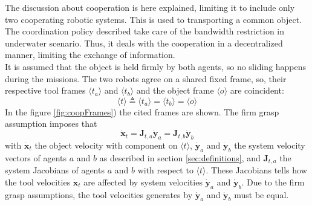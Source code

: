 The discussion about cooperation is here explained, limiting it to include only two cooperating robotic systems. This is used to transporting a common object. The coordination policy described take care of the bandwidth restriction in underwater scenario. Thus, it deals with the cooperation in a decentralized manner, limiting the exchange of information.\\
It is assumed that the object is held firmly by both agents, so no sliding happens during the missions. The two robots agree on a shared fixed frame, so, their respective tool frames $\langle t_a \rangle$ and $\langle t_b \rangle$ and the object frame $\langle o \rangle$ are coincident: 
\begin{equation*} 
\langle t \rangle \triangleq \langle t_a \rangle = \langle t_b \rangle = \langle o \rangle
\end{equation*}
In the figure \ref{fig:coopFrames}) the cited frames are shown.
The firm grasp assumption imposes that
\begin{equation}\label{eq:coopintro}
	\boldsymbol{\dot{x}}_t = \boldsymbol{J}_{t,a} \boldsymbol{\dot{y}}_a = \boldsymbol{J}_{t,b} \boldsymbol{\dot{y}}_b
\end{equation}
with $\boldsymbol{\dot{x}}_t$ the object velocity with component on $\langle t \rangle$, $\boldsymbol{\dot{y}}_a$ and $\boldsymbol{\dot{y}}_b$ the system velocity vectors of agents $a$ and $b$ as described in section \ref{sec:definitions}, and $\boldsymbol{J}_{t,a}$ the system Jacobians of agents $a$ and $b$ with respect to $\langle t \rangle$. These Jacobians tells how the tool velocities $\boldsymbol{\dot{x}}_t$ are affected by system velocities $\boldsymbol{\dot{y}}_a$ and $\boldsymbol{\dot{y}}_b$. Due to the firm grasp assumptions, the tool velocities generates by $\boldsymbol{\dot{y}}_a$ and $\boldsymbol{\dot{y}}_b$ must be equal.\\


